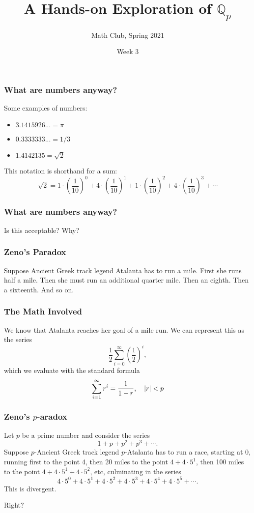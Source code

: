 \documentclass[10pt]{beamer}
\title{A Hands-on Exploration of \(\mathbb{Q}_p\)}
\subtitle{Math Club, Spring 2021}
\date{Week 3}
\author{}
\institute{University of California, Santa Barbara}
\begin{document}
\maketitle

\begin{frame}
    \frametitle{What are numbers anyway?}

    Some examples of numbers:
    \begin{itemize}
        \item \(3.1415926...=\pi\)
        \item \(0.3333333...=1/3\)
        \item \(1.4142135=\sqrt{2}\)
    \end{itemize}
    This notation is shorthand for a sum:
    \[\sqrt{2}=1\cdot\left(\frac{1}{10}\right)^0 + 4\cdot\left(\frac{1}{10}\right)^1 + 1\cdot\left(\frac{1}{10}\right)^2 + 4\cdot\left(\frac{1}{10}\right)^3 + \cdots\]

\end{frame}

\begin{frame}
    \frametitle{What are numbers anyway?}

    \begin{center}
        \Huge Is this acceptable? Why?
    \end{center}

\end{frame}

\begin{frame}
    \frametitle{Zeno's Paradox}

    Suppose Ancient Greek track legend Atalanta has to run a mile.
    First she runs half a mile.
    Then she must run an additional quarter mile.
    Then an eighth.
    Then a sixteenth.
    And so on.

\end{frame}

\begin{frame}
    \frametitle{The Math Involved}

    We know that Atalanta reaches her goal of a mile run.
    We can represent this as the series
    \[\frac{1}{2}\sum_{i=0}^\infty\left(\frac{1}{2}\right)^i,\]
    which we evaluate with the standard formula
    \[\sum_{i=1}^\infty r^i=\frac{1}{1-r},\quad \abs{r}<p\]

\end{frame}

\begin{frame}
    \frametitle{Zeno's \(p\)-aradox}

    Let \(p\) be a prime number and consider the series
    \[1+p+p^2+p^3+\cdots.\]
    Suppose \(p\)-Ancient Greek track legend \(p\)-Atalanta has to run a race, starting at 0, running first to the point 4, then 20 miles to the point \(4+4\cdot 5^1\), then 100 miles to the point \(4+4\cdot 5^1+4\cdot 5^2\), etc, culminating in the series
    \[4\cdot 5^0 + 4\cdot 5^1 + 4\cdot 5^2 + 4\cdot 5^3 + 4\cdot 5^4 + 4\cdot 5^5 + \cdots.\]
    This is divergent.

    Right?

\end{frame}
\end{document}
